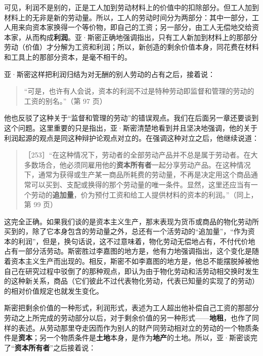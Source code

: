可见，利润不是别的，正是工人加到劳动材料上的价值中的扣除部分。但工人加到材料上的无非是新的劳动量。所以，工人的劳动时间分为两部分：其中一部分，工人用来向资本家换得一个等价物，即自己的工资；另一部分，由工人无偿地交给资本家，从而构成\textbf{利润}。亚·斯密正确地强调指出，只有工人新加到材料上的那部分劳动（价值）才分解为工资和利润；所以，新创造的剩余价值本身，同花费在材料和工具上的那部分资本，是毫不相干的。

亚·斯密这样把利润归结为对无酬的别人劳动的占有之后，接着说：

\begin{quote}“可是，也许有人会说，资本的利润不过是特种劳动即监督和管理的劳动的工资的别名。”（第 97 页）\end{quote}

他也反驳了这种关于“监督和管理的劳动”的错误观点。我们在后面另一章还要谈到这个问题。这里重要的只是指出，亚·斯密清楚地看到并且坚决地强调，他的关于利润起源的观点是同这种辩护论观点对立的。在强调这种对立之后，他继续说道：

\begin{quote}［253］“在这种情况下，劳动者的全部劳动产品并不总是属于劳动者。在大多数场合，他必须同雇用他的\textbf{资本所有者}一起分享劳动产品。在这种情况下，通常为获得或生产某一商品所耗费的劳动量，不再是决定用这个商品通常可以买到、支配或换得的那个劳动量的唯一条件。显然，这里还应当有一个劳动的\textbf{追加量}，价为预付工资和给工人提供材料的资本的利润。”（同上，第 99 页）\end{quote}

这完全正确。如果我们谈的是资本主义生产，那末表现为货币或商品的物化劳动所买到的，除了它本身包含的劳动量之外，总还有一个活劳动的“追加量”，“作为资本的利润”，但是，换句话说，这不过意味着，物化劳动无偿地占有，不付代价地占有一部分活劳动。斯密胜过李嘉图的地方是，他有力地强调指出，这个变化是随着资本主义生产而出现的。相反，斯密不如李嘉图的地方是，他总不能摆脱掉被他自己在研究过程中驳倒了的那种观点，即认为由于物化劳动和活劳动相交换时发生的这种新关系，商品（它们彼此不过代表物化劳动，代表已知量的实现了的劳动）的相对价值规定也就发生变化。

斯密把剩余价值的一种形式，利润形式，表述为工人超出他补偿自己工资的那部分劳动之上所完成的劳动部分以后，对于剩余价值的另一种形式——\textbf{地租}，也作了同样的表述。从劳动那里夺走因而作为别人的财产同劳动相对立的劳动的一个物质条件是\textbf{资本}；另一个物质条件是\textbf{土地}本身，是作为\textbf{地产}的土地。所以，亚·斯密谈完了“\textbf{资本所有者}”之后接着说：

